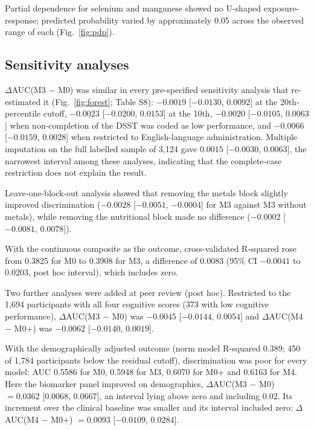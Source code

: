 \documentclass[12pt]{article}
\newcommand{\deltaauc}{$\Delta$AUC}
\begin{document}
Partial dependence for selenium and manganese showed no U-shaped exposure-response; predicted probability varied by approximately 0.05 across the observed range of each (Fig.~\ref{fig:pdp}).

\subsection*{Sensitivity analyses}

\deltaauc(M3 $-$ M0) was similar in every pre-specified sensitivity analysis that re-estimated it (Fig.~\ref{fig:forest}; Table S8): $-0.0019$ [$-0.0130$, $0.0092$] at the 20th-percentile cutoff, $-0.0023$ [$-0.0200$, $0.0153$] at the 10th, $-0.0020$ [$-0.0105$, $0.0063$] when non-completion of the DSST was coded as low performance, and $-0.0066$ [$-0.0159$, $0.0028$] when restricted to English-language administration. Multiple imputation on the full labelled sample of 3,124 gave $0.0015$ [$-0.0030$, $0.0063$], the narrowest interval among these analyses, indicating that the complete-case restriction does not explain the result.

Leave-one-block-out analysis showed that removing the metals block slightly improved discrimination ($-0.0028$ [$-0.0051$, $-0.0004$] for M3 against M3 without metals), while removing the nutritional block made no difference ($-0.0002$ [$-0.0081$, $0.0078$]).

With the continuous composite as the outcome, cross-validated R-squared rose from 0.3825 for M0 to 0.3908 for M3, a difference of 0.0083 (95\% CI $-0.0041$ to $0.0203$, post hoc interval), which includes zero.

Two further analyses were added at peer review (post hoc). Restricted to the 1,694 participants with all four cognitive scores (373 with low cognitive performance), \deltaauc(M3 $-$ M0) was $-0.0045$ [$-0.0144$, $0.0054$] and \deltaauc(M4 $-$ M0+) was $-0.0062$ [$-0.0140$, $0.0019$].

With the demographically adjusted outcome (norm model R-squared 0.389; 450 of 1,784 participants below the residual cutoff), discrimination was poor for every model: AUC 0.5586 for M0, 0.5948 for M3, 0.6070 for M0+ and 0.6163 for M4. Here the biomarker panel improved on demographics, \deltaauc(M3 $-$ M0) $= 0.0362$ [$0.0068$, $0.0667$], an interval lying above zero and including 0.02. Its increment over the clinical baseline was smaller and its interval included zero: \deltaauc(M4 $-$ M0+) $= 0.0093$ [$-0.0109$, $0.0284$].

\end{document}
